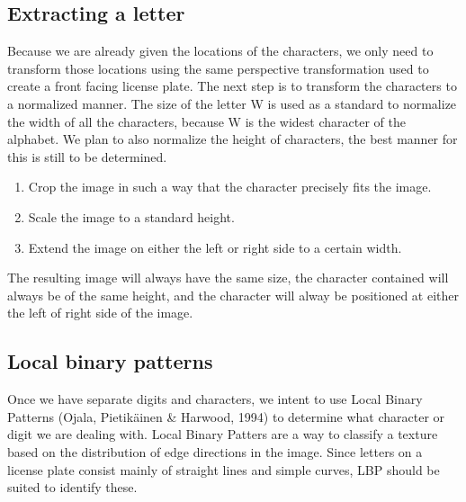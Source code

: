 \documentclass[a4paper]{article}
\begin{document}
\subsection{Extracting a letter}

Because we are already given the locations of the characters, we only need to
transform those locations using the same perspective transformation used to
create a front facing license plate. The next step is to transform the
characters to a normalized manner. The size of the letter W is used as a
standard to normalize the width of all the characters, because W is the widest
character of the alphabet. We plan to also normalize the height of characters,
the best manner for this is still to be determined.

\begin{enumerate}
    \item Crop the image in such a way that the character precisely fits the
          image.
    \item Scale the image to a standard height.
    \item Extend the image on either the left or right side to a certain width.
\end{enumerate}

The resulting image will always have the same size, the character contained
will always be of the same height, and the character will alway be positioned
at either the left of right side of the image.

\subsection{Local binary patterns}
Once we have separate digits and characters, we intent to use Local Binary
Patterns (Ojala, Pietikäinen \& Harwood, 1994) to determine what character
or digit we are dealing with. Local Binary
Patters are a way to classify a texture based on the distribution of edge
directions in the image. Since letters on a license plate consist mainly of
straight lines and simple curves, LBP should be suited to identify these.
\end{document}

